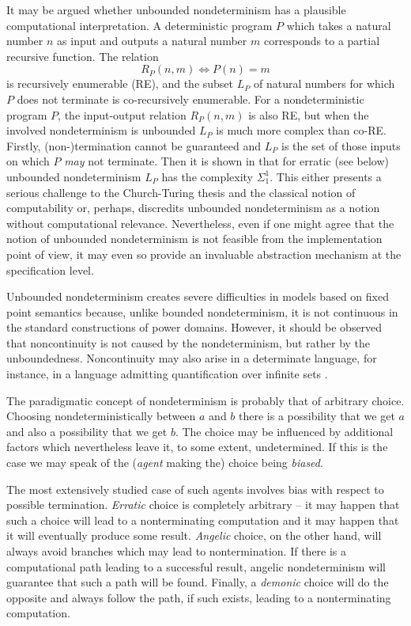 It may be argued \cite{c:30, c:54} 
whether unbounded nondeterminism has a plausible computational 
interpretation. A deterministic program $P$ which takes a natural 
number $n$ as input and outputs a natural number $m$
 corresponds to a partial recursive function. The relation 
 \[
  R_{P}(n,m) \iff P(n)=m
  \] 
\noindent 
is recursively enumerable (RE), and 
the subset $L_{P}$ of natural numbers for which $P$ 
does not terminate is co-recursively enumerable. For a nondeterministic 
program $P$, the input-output relation $R_{P}(n,m)$ is also RE, but when the involved 
nondeterminism is unbounded $L_{P}$ is much more 
complex than co-RE. Firstly, (non-)termination cannot be guaranteed 
and $L_{P}$ is the set of those inputs on which 
$P$ {\em may} not terminate. Then it is shown in \cite{c:25} that for 
erratic (see below) unbounded nondeterminism $L_{P}$ has the 
complexity $\Sigma_{1}^{1}$.
 This either presents a serious challenge to the Church-Turing 
thesis and the classical notion of computability or, perhaps, 
discredits unbounded nondeterminism as a notion without computational 
relevance. Nevertheless, even if one might agree that the notion 
of unbounded nondeterminism is not feasible from the 
implementation point of view, it may even so provide an invaluable 
abstraction mechanism at the specification level.
 
Unbounded nondeterminism creates severe difficulties in models based 
on fixed point semantics because, unlike bounded nondeterminism, it 
is not continuous in the standard constructions of power domains. 
However, it should be observed that noncontinuity is 
not caused by the nondeterminism, but rather by the unboundedness. 
Noncontinuity may also arise in a determinate language, for instance, 
in a language admitting quanti\-fication over infinite sets \cite{c:18, c:22}.

 The paradigmatic concept of 
nondeterminism is probably that of arbitrary choice. Choosing 
nondeterministically between $a$ and $b$ there is a possibility 
that we get $a$ and also a possibility that we get $b$. 
The choice may be influenced by additional factors which 
never\-theless leave it, to some extent, undetermined. If this is the 
case we may speak of the ({\em agent} making the) choice being {\em 
biased}. 

The most extensively studied 
case of such agents involves bias with respect to possible 
termination. {\em Erratic} choice \cite{c:24} is completely arbitrary -- 
 it may happen that such a choice will lead to a nonterminating 
computation and it may happen that it will eventually produce some 
result. {\em Angelic}
 choice, on the other hand, will always avoid branches which may lead 
to nontermination. If there is a computational path leading to a 
successful result, angelic nondeterminism will guarantee that such a 
path will be found. Finally, a {\em demonic}
 choice will do the opposite and always follow the path, if such 
exists, leading to a nonterminating computation.

